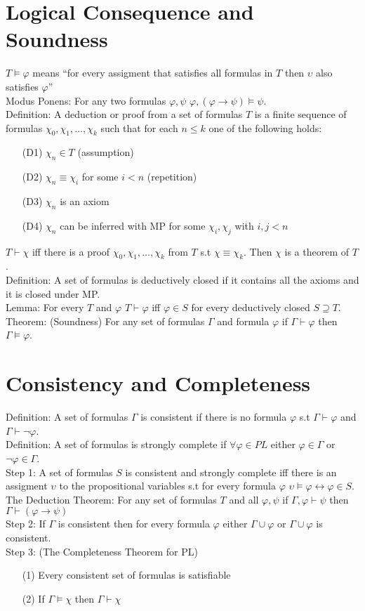 \documentclass[10pt]{article}
\begin{document}
\section*{Logical Consequence and Soundness}
$T\models\varphi$ means ``for every assigment that satisfies all formulas in $T$ then $\upsilon$ also satisfies $\varphi$''\\
Modus Ponens: For any two formulas $\varphi,\psi$ $\varphi,(\varphi\rightarrow\psi)\models\psi$.\\
Definition: A deduction or proof from a set of formulas $T$ is a finite sequence of formulas $\chi_0,\chi_1,\ldots,\chi_k$ such that for each $n\le k$ one of the following holds:
\begin{itemize}
    \item [(D1)] $\chi_n\in T$ (assumption)
    \item [(D2)] $\chi_n\equiv \chi_i$ for some $i<n$ (repetition)
    \item [(D3)] $\chi_n$ is an axiom
    \item [(D4)] $\chi_n$ can be inferred with MP for some $\chi_i,\chi_j$ with $i,j<n$
\end{itemize}
$T\vdash \chi$ iff there is a proof $\chi_0,\chi_1,\ldots,\chi_k$ from $T$ s.t $\chi\equiv\chi_k$. Then $\chi$ is a theorem of $T$.\\
Definition: A set of formulas is deductively closed if it contains all the axioms and it is closed under MP.\\
Lemma: For every $T$ and $\varphi$ $T\vdash\varphi$ iff $\varphi\in S$ for every deductively closed $S\supseteq T$.\\
Theorem: (Soundness) For any set of formulas $\Gamma$ and formula $\varphi$ if $\Gamma\vdash\varphi$ then $\Gamma\models\varphi$.
\section*{Consistency and Completeness}
Definition: A set of formulas $\Gamma$ is consistent if there is no formula $\varphi$ s.t $\Gamma\vdash\varphi$ and $\Gamma\vdash\lnot\varphi$.\\
Definition: A set of formulas is strongly complete if $\forall\varphi\in PL$ either $\varphi\in \Gamma$ or $\lnot\varphi\in\Gamma$.\\
Step 1: A set of formulas $S$ is consistent and strongly complete iff there is an assigment $\upsilon$ to the propositional variables s.t for every formula $\varphi$ $\upsilon\models\varphi\leftrightarrow\varphi\in S$.\\
The Deduction Theorem: For any set of formulas $T$ and all $\varphi,\psi$ if $\Gamma,\varphi\vdash \psi$ then $\Gamma\vdash(\varphi\rightarrow\psi)$\\
Step 2: If $\Gamma$ is consistent then for every formula $\varphi$ either $\Gamma\cup\varphi$ or $\Gamma\cup\varphi$ is consistent.\\
Step 3: (The Completeness Theorem for PL) 
\begin{itemize}
    \item [(1)] Every consistent set of formulas is satisfiable
    \item [(2)] If $\Gamma\models\chi$ then $\Gamma\vdash\chi$
\end{itemize}
\end{document}
